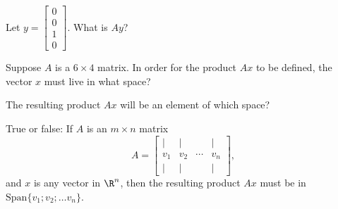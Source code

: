 


Let $y = \left[\begin{array}{c} 0 \\ 0 \\ 1 \\0
\end{array} \right].$   What is $Ay$?  


\edXsolution{ 
}


\endedxproblem




Suppose $A$ is a $6\times 4$ matrix.  In order for the product $Ax$ to be defined, the vector $x$ must live
in what space?  



The resulting product $Ax$ will be an element of which space?  


\edXsolution{  }

\endedxproblem




     

True or false: If $A$ is an $m\times n$ matrix
\[ A = \left[ \begin{array}{cccc} | & | & & | \\ 
v_1 & v_2 & \cdots & v_n \\
 | & | & & | \end{array} \right], \]
 and $x$ is any vector in $\R^n$, then the resulting product $Ax$ must be in $\mathrm{Span}\{v_1; v_2; \ldots v_n\}$.  



\edXsolution{  }

\endedxproblem





\endedxvertical




